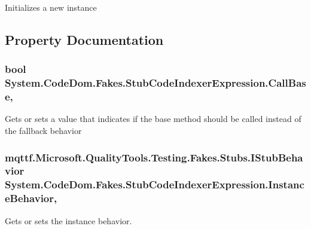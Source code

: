 Initializes a new instance



\subsection{Property Documentation}
\hypertarget{class_system_1_1_code_dom_1_1_fakes_1_1_stub_code_indexer_expression_af681ac655092284bb9ae3afaf42c737d}{
\subsubsection[{Call\-Base}]{\setlength{\rightskip}{0pt plus 5cm}bool System.\-Code\-Dom.\-Fakes.\-Stub\-Code\-Indexer\-Expression.\-Call\-Base\hspace{0.3cm}{\ttfamily [get]}, {\ttfamily [set]}}}\label{class_system_1_1_code_dom_1_1_fakes_1_1_stub_code_indexer_expression_af681ac655092284bb9ae3afaf42c737d}


Gets or sets a value that indicates if the base method should be called instead of the fallback behavior

\hypertarget{class_system_1_1_code_dom_1_1_fakes_1_1_stub_code_indexer_expression_a8293443ca29eeb91e23c71b4a6472b9d}{
\subsubsection[{Instance\-Behavior}]{\setlength{\rightskip}{0pt plus 5cm}mqttf.\-Microsoft.\-Quality\-Tools.\-Testing.\-Fakes.\-Stubs.\-I\-Stub\-Behavior System.\-Code\-Dom.\-Fakes.\-Stub\-Code\-Indexer\-Expression.\-Instance\-Behavior\hspace{0.3cm}{\ttfamily [get]}, {\ttfamily [set]}}}\label{class_system_1_1_code_dom_1_1_fakes_1_1_stub_code_indexer_expression_a8293443ca29eeb91e23c71b4a6472b9d}


Gets or sets the instance behavior.

